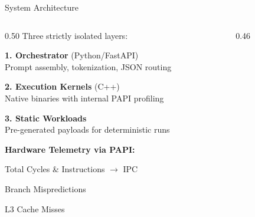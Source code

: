 \documentclass[aspectratio=169, 12pt]{beamer}
\begin{document}
\begin{frame}{System Architecture}
  \begin{columns}[T]
    \begin{column}{0.50\textwidth}
      \vspace{4pt}
      {\color{textSecondary}\small Three strictly isolated layers:}
      \vspace{6pt}
      
      {\color{accentCyan}\bfseries\small 1. Orchestrator} {\color{textSecondary}\scriptsize (Python/FastAPI)}\\[2pt]
      {\color{textSecondary}\scriptsize Prompt assembly, tokenization, JSON routing}
      \vspace{6pt}
      
      {\color{accentGreen}\bfseries\small 2. Execution Kernels} {\color{textSecondary}\scriptsize (C++)}\\[2pt]
      {\color{textSecondary}\scriptsize Native binaries with internal PAPI profiling}
      \vspace{6pt}
      
      {\color{accentOrange}\bfseries\small 3. Static Workloads}\\[2pt]
      {\color{textSecondary}\scriptsize Pre-generated payloads for deterministic runs}
      \vspace{8pt}
      
      {\color{accentPurple}\bfseries\small Hardware Telemetry via PAPI:}
      \begin{itemize}\itemsep1pt
        {\scriptsize
        \item Total Cycles \& Instructions $\rightarrow$ IPC
        \item Branch Mispredictions
        \item L3 Cache Misses}
      \end{itemize}
    \end{column}
    \begin{column}{0.46\textwidth}
      \vspace{4pt}
\end{column}
\end{columns}
\end{frame}
\end{document}
